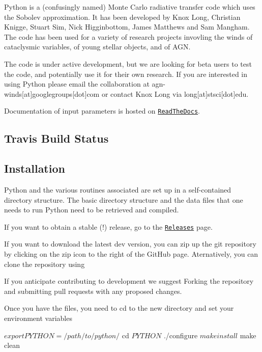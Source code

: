 Python is a (confusingly named) Monte Carlo radiative transfer code which uses the Sobolev approximation. It has been developed by Knox Long, Christian Knigge, Stuart Sim, Nick Higginbottom, James Matthews and Sam Mangham. The code has been used for a variety of research projects invovling the winds of cataclysmic variables, of young stellar objects, and of A\+GN.

The code is under active development, but we are looking for beta users to test the code, and potentially use it for their own research. If you are interested in using Python please email the collaboration at agn-\/winds\mbox{[}at\mbox{]}googlegroups\mbox{[}dot\mbox{]}com or contact Knox Long via long\mbox{[}at\mbox{]}stsci\mbox{[}dot\mbox{]}edu.

Documentation of input parameters is hosted on \href{http://agnwinds.readthedocs.io/en/dev/}{\tt Read\+The\+Docs}.

\subsection*{Travis Build Status}

\href{https://travis-ci.org/agnwinds/python}{\tt }

\subsection*{Installation}

Python and the various routines associated are set up in a self-\/contained directory structure. The basic directory structure and the data files that one needs to run Python need to be retrieved and compiled.

If you want to obtain a stable (!) release, go to the \href{https://github.com/agnwinds/python/releases}{\tt Releases} page.

If you want to download the latest dev version, you can zip up the git repository by clicking on the zip icon to the right of the Git\+Hub page. Aternatively, you can clone the repository using 


If you anticipate contributing to development we suggest Forking the repository and submitting pull requests with any proposed changes.

Once you have the files, you need to cd to the new directory and set your environment variables \begin{DoxyVerb}$ export PYTHON = /path/to/python/
$ cd $PYTHON 
$ ./configure
$ make install
$ make clean
\end{DoxyVerb}


